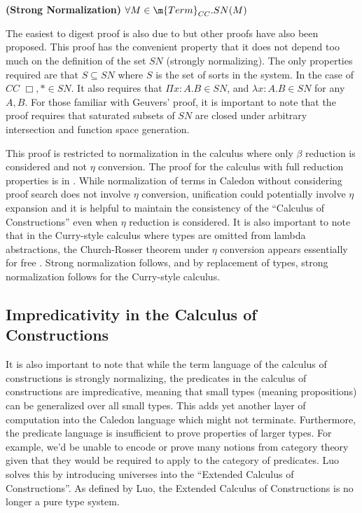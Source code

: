 \begin{theorem}
\textbf{(Strong Normalization)} $\forall M \in \m{Term}_{CC}. SN(M)$
\label{cc:cons}
\end{theorem}

The easiest to digest proof is also due to \citet{Geuvers94ashort} 
but other proofs have also been proposed.  This proof has the convenient
property that it does not depend too much on the definition of the set $SN$ 
(strongly normalizing). The only properties required are that $S \subseteq SN$ 
where $S$ is the set of sorts in the system. In the case of $CC$ $\Box,* \in SN$.
It also requires that $\Pi x : A . B \in SN$, and $\lambda x : A . B \in SN$ 
for any $A,B$.  For those familiar with Geuvers' proof, 
it is important to note that the proof requires that saturated subsets of $SN$ are closed under
arbitrary intersection and function space generation.

This proof is restricted to normalization in the calculus where only $\beta$ reduction 
is considered and not $\eta$ conversion.  The proof for the calculus with full reduction properties is
in \citet{geuvers1993logics}.  While normalization of terms in Caledon without considering proof search does
not involve $\eta$ conversion, unification could potentially involve $\eta$ expansion and it is helpful to maintain
the consistency of the ``Calculus of Constructions'' even when $\eta$ reduction is considered.  
It is also important to note that in the Curry-style calculus where types are omitted from lambda abstractions, 
the Church-Rosser theorem under $\eta$ conversion appears essentially for free \citep{miquel2001implicit}. Strong normalization 
follows, and by replacement of types, strong normalization follows for the Curry-style calculus.

\subsection{Impredicativity in the Calculus of Constructions}

It is also important to note that while the term language of the calculus of constructions is strongly normalizing, 
the predicates in the calculus of constructions are impredicative, meaning that small types (meaning propositions) can be generalized over all small types.
This adds yet another layer of computation into the Caledon language which might not terminate.  
Furthermore, the predicate language is insufficient to prove properties of larger types.  For example, 
we'd be unable to encode or prove many notions from category theory given that they would be required to apply to the 
category of predicates.  
Luo \citep{luo1989ecc} solves this by introducing universes into the ``Extended Calculus of Constructions''.  
As defined by Luo, the Extended Calculus of Constructions is no longer a pure type system.

